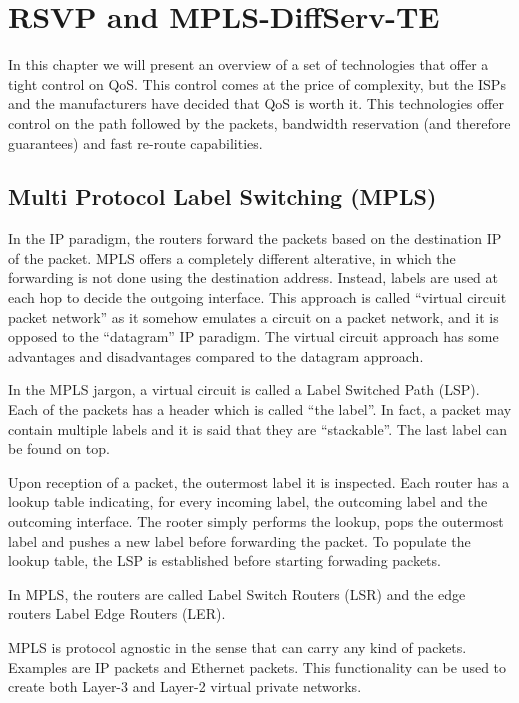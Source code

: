 \chapter{RSVP and MPLS-DiffServ-TE}

In this chapter we will present an overview of a set of technologies that offer a tight control on QoS.
This control comes at the price of complexity, but the ISPs and the manufacturers have decided that QoS is worth it.
This technologies offer control on the path followed by the packets, bandwidth reservation (and therefore guarantees) and fast re-route capabilities.

\section{Multi Protocol Label Switching (MPLS)}

In the IP paradigm, the routers forward the packets based on the destination IP of the packet.
MPLS offers a completely different alterative, in which the forwarding is not done using the destination address.
Instead, labels are used at each hop to decide the outgoing interface.
This approach is called ``virtual circuit packet network'' as it somehow emulates a circuit on a packet network, and it is opposed to the ``datagram'' IP paradigm.
The virtual circuit approach has some advantages and disadvantages compared to the datagram approach.

In the MPLS jargon, a virtual circuit is called a Label Switched Path (LSP).
Each of the packets has a header which is called ``the label''.
In fact, a packet may contain multiple labels and it is said that they are ``stackable''.
The last label can be found on top.

Upon reception of a packet, the outermost label it is inspected.
Each router has a lookup table indicating, for every incoming label, the outcoming label and the outcoming interface.
The rooter simply performs the lookup, pops the outermost label and pushes a new label before forwarding the packet.
To populate the lookup table, the LSP is established before starting forwading packets.

In MPLS, the routers are called Label Switch Routers (LSR) and the edge routers Label Edge Routers (LER).

MPLS is protocol agnostic in the sense that can carry any kind of packets.
Examples are IP packets and Ethernet packets.
This functionality can be used to create both Layer-3 and Layer-2 virtual private networks.


